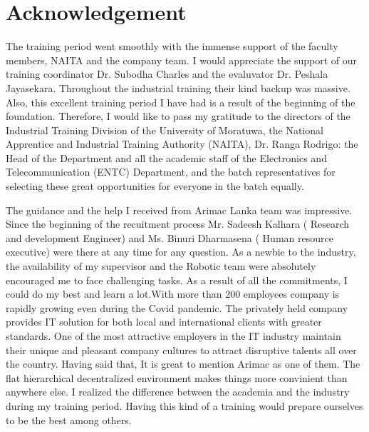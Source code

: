 \documentclass[twoside,12pt,times,onecolumn,a4paper]{report}
\begin{document}
\chapter{Acknowledgement}
\hspace{3em}The training period went smoothly with the immense support of the faculty members, NAITA and the company team. I would appreciate the support of our training coordinator Dr. Subodha Charles and the evaluvator Dr. Peshala Jayasekara. Throughout the industrial training their kind backup was massive. Also, this excellent training period I have had is a result of the beginning of the foundation. Therefore, I would like to pass my gratitude to the directors of the Industrial Training Division of the University of Moratuwa, the National Apprentice and Industrial Training Authority (NAITA), Dr. Ranga Rodrigo: the Head of the Department and all the academic staff of the Electronics and Telecommunication (ENTC) Department, and the batch representatives for selecting these great opportunities for everyone in the batch equally.

\hspace{3em}The guidance and the help I received from Arimac Lanka team was impressive. Since the beginning of the recuitment process Mr. Sadeesh Kalhara ( Research and development Engineer) and Ms. Binuri Dharmasena ( Human resource executive) were there at any time for any question. As a newbie to the industry, the availability of my supervisor and the Robotic team were absolutely encouraged me to face challenging tasks. As a result of all the commitments, I could do my best and learn a lot.With more than 200 employees company is rapidly growing even during the Covid pandemic. The privately held company provides IT solution for both local and international clients with greater standards. One of the most attractive employers in the IT industry maintain their unique and pleasant company cultures to attract disruptive talents all over the country. Having said that, It is great to mention Arimac as one of them. The flat hierarchical decentralized environment makes things more convinient than anywhere else. I realized the difference between the academia and the industry during my training period. Having this kind of a training would prepare ourselves to be the best among others.  
\end{document}
